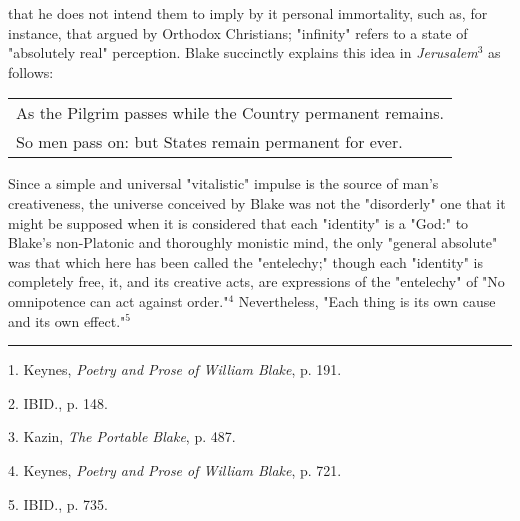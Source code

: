 that he does not intend them to imply by it personal immortality, such as, for instance, that argued
by Orthodox Christians; "infinity" refers to a state of "absolutely real" perception. Blake succinctly explains
this idea in \textit{Jerusalem}$^{3}$ as follows:\par
\begin{center}
	\parbox{0.8\textwidth}{
		\centering
		\begin{tabular}{l}
			As the Pilgrim passes while the Country permanent remains. \\
			So men pass on: but States remain permanent for ever.
		\end{tabular}
	}%
\end{center}
\hspace*{5mm}Since a simple and universal "vitalistic" impulse is the source of man's creativeness,
the universe conceived by Blake was not the "disorderly" one that it might be supposed when it is considered that each "identity" is a "God:" to
Blake's non-Platonic and thoroughly monistic mind, the only "general absolute" was that which here has been called the "entelechy;" though each "identity"
is completely free, it, and its creative acts, are expressions of the "entelechy" of
"No omnipotence can act against order."$^{4}$ Nevertheless, "Each thing is its own cause
and its own effect."$^{5}$\par
\vspace*{\fill}
\noindent\rule{0.25\textwidth}{0.4pt}\par
1. Keynes, \textit{Poetry and Prose of William Blake}, p. 191.\par
2. IBID., p. 148.\par
3. Kazin, \textit{The Portable Blake}, p. 487.\par
4. Keynes, \textit{Poetry and Prose of William Blake}, p. 721.\par
5. IBID., p. 735.\par

\newpage

{}

